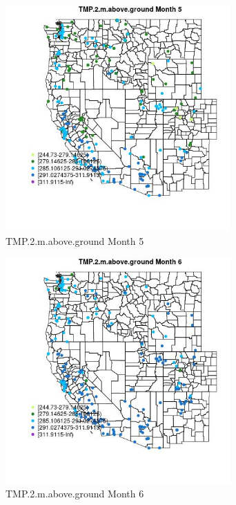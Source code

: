 \begin{figure} 
\centering  
\includegraphics[width=0.77\textwidth]{Code_Outputs/Report_ML_input_PM25_Step4_part_e_de_duplicated_aveswNAs_MapObsMo5TMP2maboveground.jpg} 
\caption{\label{fig:Report_ML_input_PM25_Step4_part_e_de_duplicated_aveswNAsMapObsMo5TMP2maboveground}TMP.2.m.above.ground Month 5} 
\end{figure} 
 

\begin{figure} 
\centering  
\includegraphics[width=0.77\textwidth]{Code_Outputs/Report_ML_input_PM25_Step4_part_e_de_duplicated_aveswNAs_MapObsMo6TMP2maboveground.jpg} 
\caption{\label{fig:Report_ML_input_PM25_Step4_part_e_de_duplicated_aveswNAsMapObsMo6TMP2maboveground}TMP.2.m.above.ground Month 6} 
\end{figure} 
 

